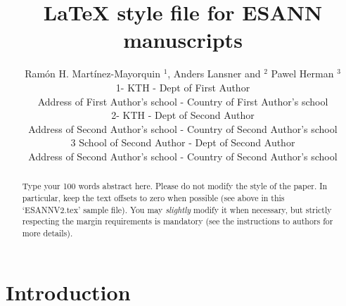 \documentclass{esannV2}
\begin{document}
\title{LaTeX style file for ESANN manuscripts}

\author{Ram\'on H. Mart\'inez-Mayorquin $^1$, Anders Lansner and $^2$ Pawel Herman $^3$
%
%
\vspace{.3cm}\\
%
1- KTH - Dept of First Author \\
Address of First Author's school - Country of First Author's
school
%
\vspace{.1cm}\\
2- KTH - Dept of Second Author \\
Address of Second Author's school - Country of Second Author's school 
%
\vspace{.1cm}\\
3 School of Second Author - Dept of Second Author \\
Address of Second Author's school - Country of Second Author's school\\ 
}


\maketitle

\begin{abstract}
Type your 100 words abstract here. Please do not modify the style
of the paper. In particular, keep the text offsets to zero when
possible (see above in this `ESANNV2.tex' sample file). You may
\emph{slightly} modify it when necessary, but strictly respecting
the margin requirements is mandatory (see the instructions to
authors for more details).
\end{abstract}

\section{Introduction}
\end{document}
